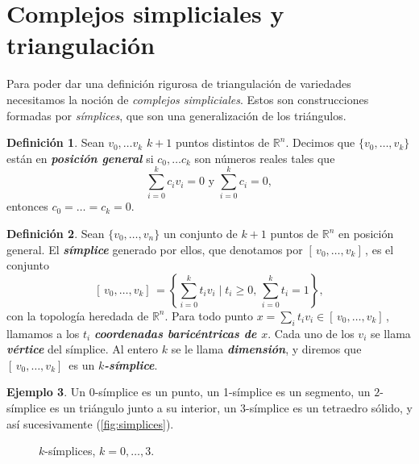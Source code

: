\documentclass[10pt]{report}
\newcommand{\R}{\mathbb{R}}
\newcommand{\enfatiza}[1]{\textbf{\textit{#1}}}
\theoremstyle{definition}
\newtheorem{defin}{Definición}[section]
\newtheorem{eje}[defin]{Ejemplo}
\begin{document}
\section{Complejos simpliciales y triangulación}\label{sec:simplices}

Para poder dar una definición rigurosa de triangulación de variedades necesitamos la noción de \textit{complejos simpliciales}. Estos son construcciones formadas por \textit{símplices}, que son una generalización de los triángulos. 

\begin{defin}%
Sean $v_0,\dots v_k$ $k+1$ puntos distintos de $\R^n$. Decimos que $\{ v_0,\dots ,v_k\}$ están en \enfatiza{posición general} si $c_0,\dots c_k$ son números reales tales que  $$\sum_{i=0}^{k}c_iv_i=0 \text{ y } \sum_{i=0}^kc_i=0,$$ entonces $c_0=\dots =c_k=0$.
\end{defin}


\begin{defin}%
Sean $\{ v_0,\dots ,v_n\}$ un conjunto de $k+1$ puntos de $\R^n$ en posición general. El \enfatiza{símplice} generado por ellos, que denotamos por $[ \, v_0,\dots ,v_k ] \,$, es el conjunto $$[ \, v_0,\dots ,v_k] \, =\left\{  \sum_{i=0}^{k}t_iv_i \mid t_i\geq 0,\, \sum_{i=0}^{k}t_i=1 \right\}, $$ con la topología heredada de $\R^n$. Para todo punto $x=\sum_it_iv_i\in [ \, v_0,\dots ,v_k] \,$, llamamos a los $t_i$ \enfatiza{coordenadas baricéntricas de $x$}. Cada uno de los $v_i$ se llama \enfatiza{vértice} del símplice. Al entero $k$ se le llama \enfatiza{dimensión}, y diremos que $[ \, v_0,\dots ,v_k] \,$ es un \enfatiza{$k$-símplice}. 
\end{defin}

\begin{eje}
Un $0$-símplice es un punto, un 1-símplice es un segmento, un $2$-símplice es un triángulo junto a su interior, un $3$-símplice es un tetraedro sólido, y así sucesivamente (\autoref{fig:simplices}).
\end{eje}

\begin{figure}[b]
\centering
{}
\caption{$k$-símplices, $k=0,\dots ,3$.\label{fig:simplices}}
\end{figure}
\end{document}
